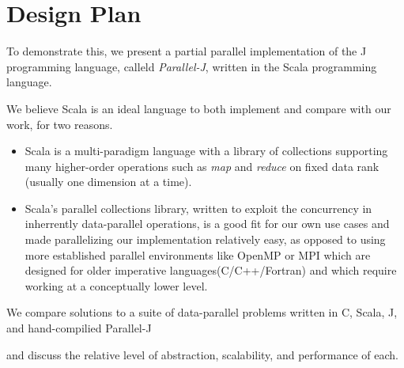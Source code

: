 \section{Design Plan}
%
% 
% 
To demonstrate this, we present a partial parallel implementation of the J programming language, calleld \textit{Parallel-J}, written in the Scala programming language.\begin{comment}TODO cite?\end{comment}
We believe Scala is an ideal language to both implement and compare with our work, for two reasons.
\begin{itemize}
    \item Scala is a multi-paradigm language with a library of collections supporting many higher-order operations such as \textit{map} and \textit{reduce} on fixed data rank (usually one dimension at a time).%
    \item Scala's parallel collections library\cite{pc}, written to exploit the concurrency in inherrently data-parallel operations, is a good fit for our own use cases and made parallelizing our implementation relatively easy, as opposed to using more established parallel environments like OpenMP or MPI which are designed for older imperative languages(C/C++/Fortran) and which require working at a conceptually lower level.
\end{itemize}
We compare solutions to a suite of data-parallel problems written in C, Scala, J, and hand-compilied Parallel-J\begin{comment}TODO really should change name\end{comment} and discuss the relative level of abstraction, scalability, and performance of each.

